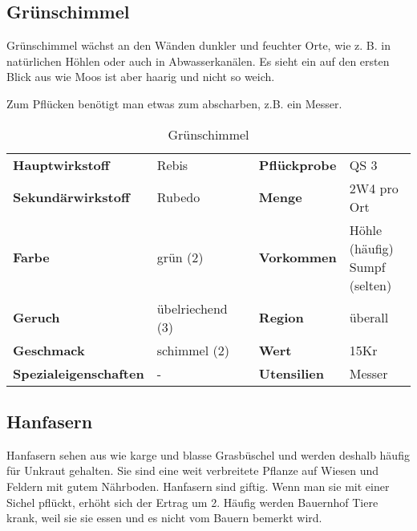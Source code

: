 \subsection{Grünschimmel}
Grünschimmel wächst an den Wänden dunkler und feuchter Orte, wie z. B. in natürlichen Höhlen oder auch in Abwasserkanälen. Es sieht ein auf den ersten Blick aus wie Moos ist aber haarig und nicht so weich.

Zum Pflücken benötigt man etwas zum abscharben, z.B. ein Messer.

\begin{table}[h] 
\begin{center} 
\begin{tabular}{|l|l|p{1cm}|l|l|} 
  	\cline{1-2} \cline{4-5} 
  	\textbf{Hauptwirkstoff} & Rebis && \textbf{Pflückprobe} & QS 3 \\ \cline{1-2} \cline{4-5} 
  	\textbf{Sekundärwirkstoff} & Rubedo && \textbf{Menge} & 2W4 pro Ort \\ \cline{1-2} \cline{4-5} 
  	\textbf{Farbe} & grün (2) && \textbf{Vorkommen} & \brcell{Höhle (häufig) \\ Sumpf (selten)} \\ \cline{1-2} \cline{4-5} 
  	\textbf{Geruch} & übelriechend (3) && \textbf{Region} & überall \\ \cline{1-2} \cline{4-5} 
  	\textbf{Geschmack} & schimmel (2) && \textbf{Wert} & 15Kr \\ \cline{1-2} \cline{4-5} 
  	\textbf{Spezialeigenschaften} & - && \textbf{Utensilien} & Messer \\ \cline{1-2} \cline{4-5} 
\end{tabular} 
\end{center} 
\caption{Grünschimmel} 
\label{tab:gruenschimmel} 
\end{table}


\subsection{Hanfasern}
Hanfasern sehen aus wie karge und blasse Grasbüschel und werden deshalb häufig für Unkraut gehalten. Sie sind eine weit verbreitete Pflanze auf Wiesen und Feldern mit gutem Nährboden. Hanfasern sind giftig. Wenn man sie mit einer Sichel pflückt, erhöht sich der Ertrag um 2. Häufig werden Bauernhof Tiere krank, weil sie sie essen und es nicht vom Bauern bemerkt wird.

